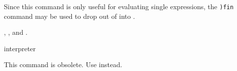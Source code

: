 {{{{{{{Since this command is only useful  for evaluating single expressions, the
{\tt )fin}
command may be used to  drop out  of \Language{}  into \Lisp{}.

\par{}
,
, and
.





\par{} interpreter


\par{}

This command is obsolete. Use  instead.


}}}}}}}
